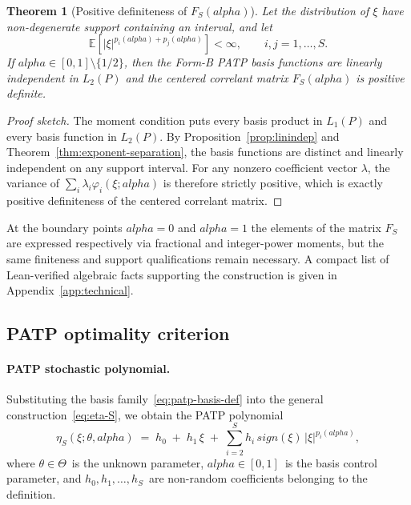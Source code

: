 \documentclass[11pt]{article}
\def\alpha{alpha}%
\def\mathbf#1{#1}%
\def\mathrm#1{#1}%
\def\tfrac#1#2{#1/#2}%
\newtheorem{theorem}{Theorem}[section]
\theoremstyle{definition}
\newcommand{\E}{\mathbb{E}}
\begin{document}
\begin{theorem}[Positive definiteness of $\mathbf{F}_S(\alpha)$]\label{thm:positive-definite}
Let the distribution of $\xi$ have non-degenerate support containing an
interval, and let
\[
  \E\!\left[|\xi|^{p_i(\alpha)+p_j(\alpha)}\right] < \infty,
  \qquad i,j=1,\ldots,S.
\]
If $\alpha\in[0,1]\setminus\{\tfrac{1}{2}\}$, then the Form-B PATP basis
functions are linearly independent in $L_2(P)$ and the centered correlant
matrix $\mathbf{F}_S(\alpha)$ is positive definite.
\end{theorem}

\begin{proof}[Proof sketch]
The moment condition puts every basis product in $L_1(P)$ and every basis
function in $L_2(P)$. By Proposition~\ref{prop:linindep} and
Theorem~\ref{thm:exponent-separation}, the basis functions are distinct and
linearly independent on any support interval. For any nonzero coefficient
vector $\lambda$, the variance of
$\sum_i\lambda_i\varphi_i(\xi;\alpha)$ is therefore strictly positive, which
is exactly positive definiteness of the centered correlant matrix.
\end{proof}

At the boundary points $\alpha = 0$ and $\alpha = 1$ the elements of the
matrix $\mathbf{F}_S$ are expressed respectively via fractional and
integer-power moments, but the same finiteness and support qualifications
remain necessary. A compact list of Lean-verified algebraic facts supporting
the construction is given in Appendix~\ref{app:technical}.

\subsection{PATP optimality criterion}\label{sec:patp:criterion}

\paragraph{PATP stochastic polynomial.}
Substituting the basis family~\eqref{eq:patp-basis-def} into the general
construction~\eqref{eq:eta-S}, we obtain the PATP polynomial
\begin{equation}\label{eq:patp-poly}
  \eta_S(\xi; \theta, \alpha)
  \;=\; h_0
       \;+\; h_1\,\xi
       \;+\; \sum_{i=2}^{S} h_i\,
              \mathrm{sign}(\xi)\,|\xi|^{p_i(\alpha)},
\end{equation}
where $\theta \in \Theta$~is the unknown parameter, $\alpha \in [0,1]$~is
the basis control parameter, and $h_0, h_1, \ldots, h_S$~are non-random
coefficients belonging to the definition.
\end{document}
